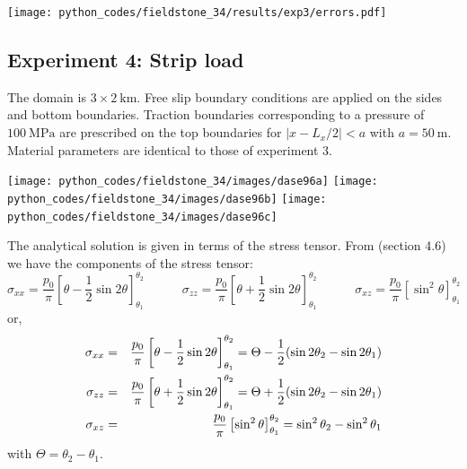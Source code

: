 \begin{center}
\texttt{[image: python\_codes/fieldstone\_34/results/exp3/errors.pdf]}
\end{center}


\subsection*{Experiment 4: Strip load}

The domain is $3 \times 2~\si{\km}$. Free slip boundary conditions are 
applied on the sides and bottom boundaries. 
Traction boundaries corresponding to a pressure of $\SI{100}{\mega\pascal}$
are prescribed on the top boundaries for $|x-L_x/2|<a$ with $a=\SI{50}{\meter}$.
Material parameters are identical to those of experiment 3.

\begin{center}
\texttt{[image: python\_codes/fieldstone\_34/images/dase96a]}
\texttt{[image: python\_codes/fieldstone\_34/images/dase96b]}
\texttt{[image: python\_codes/fieldstone\_34/images/dase96c]}
\end{center}


The analytical solution is given in terms of the stress tensor.
From \textcite{dase96}(section 4.6) we have the components of the stress tensor:
\[
\sigma_{xx}=\frac{p_0}{\pi}\left[ \theta - \frac{1}{2}\sin 2\theta  \right]^{\theta_2}_{\theta_1}
\quad\quad\quad
\sigma_{zz}=\frac{p_0}{\pi}\left[ \theta + \frac{1}{2}\sin 2\theta  \right]^{\theta_2}_{\theta_1}
\quad\quad\quad
\sigma_{xz}=\frac{p_0}{\pi}\left[ \sin^2 \theta  \right]^{\theta_2}_{\theta_1}
\]
or, 
\begin{eqnarray}
{\sigma}_{xx}&=&\frac{p_0}{\pi}\left[ \theta - \frac{1}{2}\sin 2\theta  \right]^{\theta_2}_{\theta_1} = \Theta - \frac{1}{2} ( \sin 2\theta_2 - \sin 2\theta_1) \nonumber\\
{\sigma}_{zz}&=&\frac{p_0}{\pi}\left[ \theta + \frac{1}{2}\sin 2\theta  \right]^{\theta_2}_{\theta_1} = \Theta + \frac{1}{2} ( \sin 2\theta_2 - \sin 2\theta_1) \nonumber\\
{\sigma}_{xz}&=&\frac{p_0}{\pi}\left[ \sin^2 \theta  \right]^{\theta_2}_{\theta_1} =  \sin^2 \theta_2 - \sin^2 \theta_1 \nonumber
\end{eqnarray}
with $\Theta=\theta_2-\theta_1$. 

